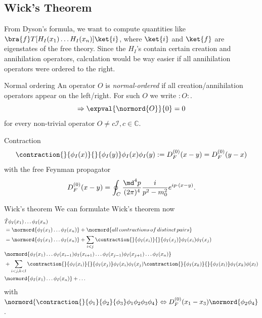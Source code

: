 \subsection{Wick's Theorem}
From Dyson's formula, we want to compute quantities like $\bra{f}T[H_I(x_1)\dots H_I(x_n)] \ket{i}$, where $\ket{i}$ and $\ket{f}$ are eigenstates of the free theory. Since the $H_I$'s contain certain creation and annihilation operators, calculation would be way easier if all annihilation operators were ordered to the right.
\begin{mybox}{Normal ordering}
	An operator $O$ is \emph{normal-ordered} if all creation/annihilation operators appear on the left/right. For such $O$ we write $:O:$.
	\begin{equation}
		\Rightarrow \expval{\normord{O}}{0} = 0
	\end{equation}
	for every non-trivial operator $O\neq c \mathcal{I}, c\in \mathbb{C}$.
\end{mybox}
\begin{mybox}{Contraction}
	\begin{equation}
		\contraction{}{\phi_I(x)}{}{\phi_I(y)} \phi_I(x) \phi_I(y) := D^{(0)}_F (x-y) = D^{(0)}_F(y-x)
	\end{equation}
	with the free Feynman propagator
	\begin{equation}
		D^{(0)}_F(x-y) =\oint_C \frac{\md^4p}{(2 \pi)^4} \frac{i}{p^2-m^2_0} e^{i p\cdot (x-y)}.
	\end{equation}
\end{mybox}
\begin{mybox}{Wick's theorem}
	We can formulate Wick's theorem now
	\begin{align*}
		&\hat{T}\phi_I(x_1) \dots \phi_I(x_n) \\
		&= \normord{\phi_I(x_1) \dots \phi_I(x_n)} + \normord{all \,contractions\, of \,distinct\, pairs} \\
				&= \normord{\phi_I(x_1) \dots \phi_I(x_n)} + \sum_{i<j} \contraction{}{\phi_I(x_i)}{}{\phi_I(x_j)} \phi_I(x_i) \phi_I(x_j) \\
				&\normord{\phi_I(x_1) \dots \phi_I(x_{i-1})\phi_I(x_{i+1}) \dots  \phi_I(x_{j-1}) \phi_I(x_{j+1}) \dots \phi_I(x_n)} \\
				&+ \sum_{i<j, k<l} \contraction{}{\phi_I(x_i)}{}{\phi_I(x_j)} \phi_I(x_i) \phi_I(x_j) \contraction{}{\phi_I(x_k)}{}{\phi_I(x_l)} \phi_I(x_k) \phi(x_l) \\
				&\normord{\phi_I(x_1) \dots \phi_I(x_n)}+ \dots 
	\end{align*}
with $\normord{\contraction{}{\phi_1}{\phi_2}{\phi_3} \phi_1 \phi_2 \phi_3 \phi_4} \Leftrightarrow D^{(0)}_F(x_1-x_3) \normord{\phi_2 \phi_4}$.
\end{mybox}
